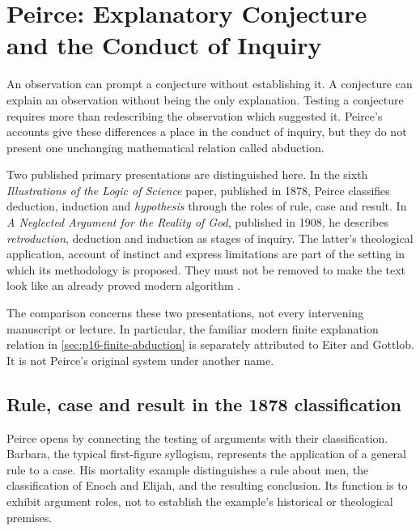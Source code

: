 \chapter{Peirce: Explanatory Conjecture and the Conduct of Inquiry}
\label{sec:p16-peirce-abduction-and-inquiry}

An observation can prompt a conjecture without establishing it. A conjecture
can explain an observation without being the only explanation. Testing a
conjecture requires more than redescribing the observation which suggested
it. Peirce's accounts give these differences a place in the conduct of
inquiry, but they do not present one unchanging mathematical relation
called abduction.

Two published primary presentations are distinguished here. In the sixth
\emph{Illustrations of the Logic of Science} paper, published in 1878,
Peirce classifies deduction, induction and \emph{hypothesis} through the
roles of rule, case and result. In \emph{A Neglected Argument for the
Reality of God}, published in 1908, he describes \emph{retroduction},
deduction and induction as stages of inquiry. The latter's theological
application, account of instinct and express limitations are part of
the setting in which its methodology is proposed. They must not be
removed to make the text look like an already proved modern algorithm
\parencite[secs.~I--V]{Peirce1878DIHPrimary}
\parencite[secs.~I--V]{Peirce1908NeglectedPrimary}.

The comparison concerns these two presentations, not every intervening
manuscript or lecture. In particular, the familiar modern finite
explanation relation in \cref{sec:p16-finite-abduction} is separately
attributed to Eiter and Gottlob. It is not Peirce's original system under
another name.

\section{Rule, case and result in the 1878 classification}
\label{sec:p16-peirce-1878-roles}

Peirce opens by connecting the testing of arguments with their
classification. Barbara, the typical first-figure syllogism, represents
the application of a general rule to a case. His mortality example
distinguishes a rule about men, the classification of Enoch and Elijah,
and the resulting conclusion. Its function is to exhibit argument roles,
not to establish the example's historical or theological premises.

